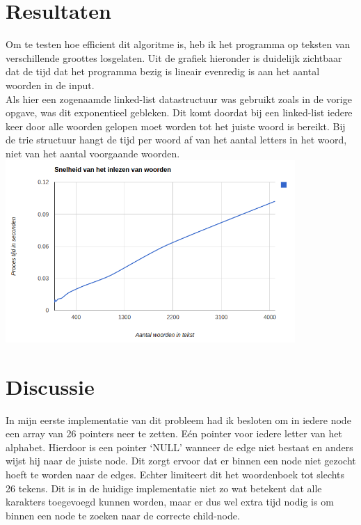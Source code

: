 \documentclass[a4paper,12pt]{article}
\begin{document}
\section{Resultaten}

Om te testen hoe efficient dit algoritme is, heb ik het programma op teksten
van verschillende groottes losgelaten. Uit de grafiek hieronder is duidelijk
zichtbaar dat de tijd dat het programma bezig is lineair evenredig is aan het
aantal woorden in de input.\\
Als hier een zogenaamde linked-list datastructuur was gebruikt zoals in de
vorige opgave, was dit exponentieel gebleken. Dit komt doordat bij een
linked-list iedere keer door alle woorden gelopen moet worden tot het juiste
woord is bereikt. Bij de trie structuur hangt de tijd per woord af van het
aantal letters in het woord, niet van het aantal voorgaande woorden.\\

\includegraphics[width=11cm]{grafiek}



\section{Discussie}

In mijn eerste implementatie van dit probleem had ik besloten om in iedere node
een array van 26 pointers neer te zetten. E\'en pointer voor iedere letter
van het alphabet. Hierdoor is een pointer `NULL' wanneer de edge niet bestaat
en anders wijst hij naar de juiste node. Dit zorgt ervoor dat er binnen een
node niet gezocht hoeft te worden naar de edges. Echter limiteert dit het
woordenboek tot slechts 26 tekens. Dit is in de huidige implementatie niet zo
wat betekent dat alle karakters toegevoegd kunnen worden, maar er dus wel
extra tijd nodig is om binnen een node te zoeken naar de correcte child-node.
\end{document}
